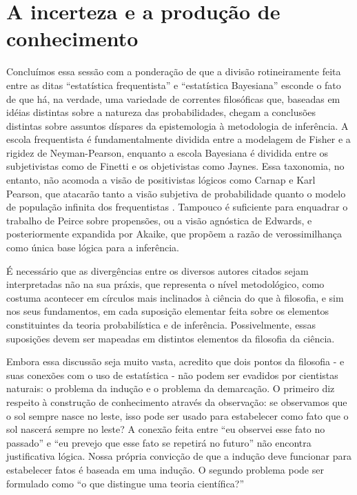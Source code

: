 \section{A incerteza e a produção de conhecimento}

Concluímos essa sessão com a ponderação de que a divisão rotineiramente feita entre as ditas ``estatística frequentista'' e 
``estatística Bayesiana'' esconde o fato de que há, na verdade, uma variedade de correntes filosóficas que, baseadas
em idéias distintas sobre a natureza das probabilidades, chegam a conclusões distintas sobre assuntos díspares da epistemologia 
à metodologia de inferência. A escola frequentista é fundamentalmente dividida entre a modelagem de Fisher e a rigidez de
Neyman-Pearson, enquanto a escola Bayesiana é dividida entre os subjetivistas como de Finetti e os objetivistas como Jaynes.
Essa taxonomia, no entanto, não acomoda a visão de positivistas lógicos como Carnap e Karl Pearson, que atacarão tanto
a visão subjetiva de probabilidade quanto o modelo de população infinita dos frequentistas \citep{Lenhard06, Zabell09}.
Tampouco é suficiente para enquadrar o trabalho de Peirce sobre propensões, ou a visão agnóstica de Edwards, e posteriormente
expandida por Akaike, que propõem a razão de verossimilhança como única base lógica para a inferência.

É necessário que as divergências entre os diversos autores citados sejam interpretadas não na sua práxis, que representa 
o nível metodológico, como costuma acontecer em círculos mais inclinados à ciência do que à filosofia, 
e sim nos seus fundamentos, em cada suposição elementar feita sobre os
elementos constituintes da teoria probabilística e de inferência. Possivelmente, essas suposições devem ser mapeadas em
distintos elementos da filosofia da ciência.

Embora essa discussão seja muito vasta, acredito que dois pontos da filosofia - e suas conexões com o uso de estatística -
não podem ser evadidos por cientistas naturais: o problema da indução e o problema da demarcação.
O primeiro diz respeito à construção de conhecimento através da observação: se observamos que o sol sempre nasce no leste,
isso pode ser usado para estabelecer como fato que o sol nascerá sempre no leste? A conexão feita entre ``eu observei esse
fato no passado'' e ``eu prevejo que esse fato se repetirá no futuro'' não encontra justificativa lógica. Nossa própria convicção
de que a indução deve funcionar para estabelecer fatos é baseada em uma indução. O segundo problema pode ser formulado como
``o que distingue uma teoria científica?''

